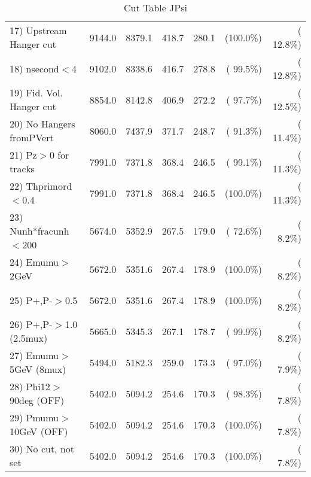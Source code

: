 \begin{table}[h!]
\begin{tabular}{||l||r|r|r|r|r|r||}
 17) Upstream Hanger cut  &       9144.0 &       8379.1 &        418.7 &        280.1 & (100.0\%) & ( 12.8\%) \\
 18) nsecond$<$4          &       9102.0 &       8338.6 &        416.7 &        278.8 & ( 99.5\%) & ( 12.8\%) \\
 19) Fid. Vol. Hanger cut &       8854.0 &       8142.8 &        406.9 &        272.2 & ( 97.7\%) & ( 12.5\%) \\
 20) No Hangers fromPVert &       8060.0 &       7437.9 &        371.7 &        248.7 & ( 91.3\%) & ( 11.4\%) \\
 21) Pz$>$0 for tracks    &       7991.0 &       7371.8 &        368.4 &        246.5 & ( 99.1\%) & ( 11.3\%) \\
 22) Thprimord$<$0.4      &       7991.0 &       7371.8 &        368.4 &        246.5 & (100.0\%) & ( 11.3\%) \\
 23) Nunh*fracunh$<$200   &       5674.0 &       5352.9 &        267.5 &        179.0 & ( 72.6\%) & (  8.2\%) \\
 24) Emumu$>$2GeV         &       5672.0 &       5351.6 &        267.4 &        178.9 & (100.0\%) & (  8.2\%) \\
 25) P+,P-$>$0.5          &       5672.0 &       5351.6 &        267.4 &        178.9 & (100.0\%) & (  8.2\%) \\
 26) P+,P-$>$1.0 (2.5mux) &       5665.0 &       5345.3 &        267.1 &        178.7 & ( 99.9\%) & (  8.2\%) \\
 27) Emumu$>$5GeV  (8mux) &       5494.0 &       5182.3 &        259.0 &        173.3 & ( 97.0\%) & (  7.9\%) \\
 28) Phi12$>$90deg  (OFF) &       5402.0 &       5094.2 &        254.6 &        170.3 & ( 98.3\%) & (  7.8\%) \\
 29) Pmumu$>$10GeV  (OFF) &       5402.0 &       5094.2 &        254.6 &        170.3 & (100.0\%) & (  7.8\%) \\
 30) No cut, not set      &       5402.0 &       5094.2 &        254.6 &        170.3 & (100.0\%) & (  7.8\%) \\
 \hline
 \hline
 \end{tabular}
 \caption{Cut Table  JPsi     }
 \label{tab-cutcohjpsi-mumu_cohrhop}
 \end{table}
